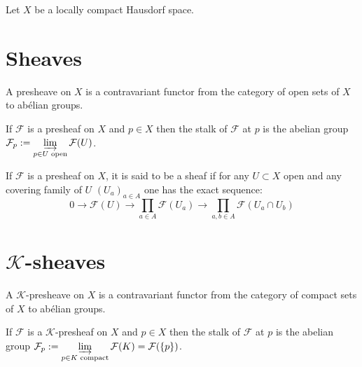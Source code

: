 
Let $X$ be a locally compact Hausdorf space.

\section{Sheaves}


\begin{definition}\label{def:pre_sheaves}
    A presheave on $X$ is a contravariant functor from the category of open sets of $X$ to abélian groups.
\end{definition}

\begin{definition}\label{def:stalk}
    If $\mathcal{F}$ is a presheaf on $X$ and $p\in X$ then the stalk of $\mathcal{F}$ at $p$ is the abelian group $\mathcal{F}_p:=\varinjlim\limits_{p\in U\text{ open}}\mathcal{F}(U)$.
\end{definition}

\begin{definition}\label{def:sheaves}
    If $\mathcal{F}$ is a presheaf on $X$, it is said to be a sheaf if for any $U\subset X$ open and any covering family of $U$ $(U_a)_{a\in A}$ one has the exact sequence:
    \begin{equation}\label{axiom:Sh}
        0\to \mathcal{F}(U)\to \prod\limits_{a\in A}\mathcal{F}(U_a)\to \prod\limits_{a,b\in A}\mathcal{F}(U_a\cap U_b)
    \end{equation}
\end{definition}

\section{$\mathcal{K}$-sheaves}

\begin{definition}\label{def:K_pre_sheaves}
    A $\mathcal{K}$-presheave on $X$ is a contravariant functor from the category of compact sets of $X$ to abélian groups.
\end{definition}

\begin{definition}\label{def:K_stalk}
    If $\mathcal{F}$ is a $\mathcal{K}$-presheaf on $X$ and $p\in X$ then the stalk of $\mathcal{F}$ at $p$ is the abelian group $\mathcal{F}_p:=\varinjlim\limits_{p\in K\text{ compact}}\mathcal{F}(K)=\mathcal{F}(\{p\})$.  
\end{definition}

